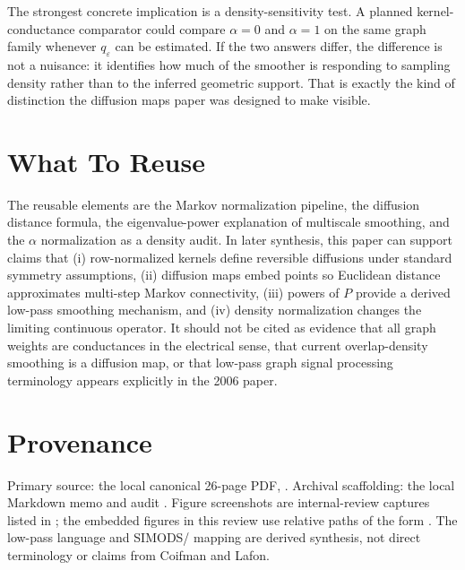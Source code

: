 \documentclass[11pt]{article}
\begin{document}
The strongest concrete implication is a density-sensitivity test.  A planned
kernel-conductance comparator could compare $\alpha=0$ and $\alpha=1$ on the
same graph family whenever $q_\varepsilon$ can be estimated.  If the two
answers differ, the difference is not a nuisance: it identifies how much of
the smoother is responding to sampling density rather than to the inferred
geometric support.  That is exactly the kind of distinction the diffusion maps
paper was designed to make visible.

\section{What To Reuse}

The reusable elements are the Markov normalization pipeline, the diffusion
distance formula, the eigenvalue-power explanation of multiscale smoothing,
and the $\alpha$ normalization as a density audit.  In later synthesis, this
paper can support claims that (i) row-normalized kernels define reversible
diffusions under standard symmetry assumptions, (ii) diffusion maps embed
points so Euclidean distance approximates multi-step Markov connectivity,
(iii) powers of $P$ provide a derived low-pass smoothing mechanism, and
(iv) density normalization changes the limiting continuous operator.  It
should not be cited as evidence that all graph weights are conductances in the
electrical sense, that current  overlap-density smoothing is a
diffusion map, or that low-pass graph signal processing terminology appears
explicitly in the 2006 paper.

\section*{Provenance}

Primary source: the local canonical 26-page PDF,
.  Archival
scaffolding: the local Markdown memo
 and audit
.  Figure
screenshots are internal-review captures listed in
; the embedded figures in this review use
relative paths of the form .  The low-pass
language and SIMODS/ mapping are derived synthesis, not direct
terminology or claims from Coifman and Lafon.



\end{document}
